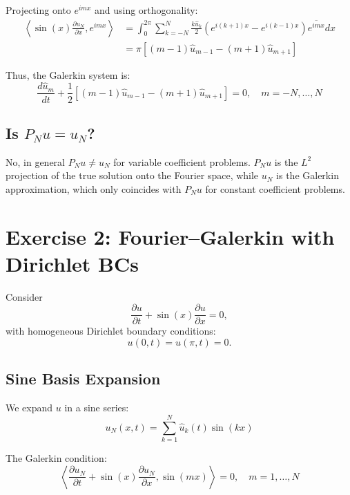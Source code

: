 \documentclass[11pt]{article}
\begin{document}
Projecting onto $e^{imx}$ and using orthogonality:
\begin{align*}
    \left\langle \sin(x) \frac{\partial u_N}{\partial x}, e^{imx} \right\rangle &= \int_0^{2\pi} \sum_{k=-N}^N \frac{k \hat{u}_k}{2} (e^{i(k+1)x} - e^{i(k-1)x}) \overline{e^{imx}} dx \\
    &= \pi \left[ (m-1) \hat{u}_{m-1} - (m+1) \hat{u}_{m+1} \right]
\end{align*}

Thus, the Galerkin system is:
\begin{equation}
    \frac{d\hat{u}_m}{dt} + \frac{1}{2} \left[ (m-1) \hat{u}_{m-1} - (m+1) \hat{u}_{m+1} \right] = 0, \quad m = -N,\ldots,N
\end{equation}

\subsection*{Is $P_N u = u_N$?}
No, in general $P_N u \neq u_N$ for variable coefficient problems. $P_N u$ is the $L^2$ projection of the true solution onto the Fourier space, while $u_N$ is the Galerkin approximation, which only coincides with $P_N u$ for constant coefficient problems.


\section*{Exercise 2: Fourier--Galerkin with Dirichlet BCs}
Consider
\begin{equation}
\frac{\partial u}{\partial t} + \sin(x) \frac{\partial u}{\partial x} = 0,
\end{equation}
with homogeneous Dirichlet boundary conditions:
\begin{equation}
 u(0,t) = u(\pi,t) = 0.
\end{equation}

\subsection*{Sine Basis Expansion}
We expand $u$ in a sine series:
\begin{equation}
    u_N(x, t) = \sum_{k=1}^N \hat{u}_k(t) \sin(kx)
\end{equation}

The Galerkin condition:
\begin{equation}
    \left\langle \frac{\partial u_N}{\partial t} + \sin(x) \frac{\partial u_N}{\partial x}, \sin(m x) \right\rangle = 0, \quad m=1,\ldots,N
\end{equation}
\end{document}
